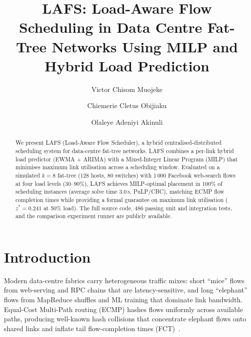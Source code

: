 \documentclass[runningheads]{llncs}
\begin{document}
\title{LAFS: Load-Aware Flow Scheduling in Data Centre Fat-Tree Networks Using MILP and Hybrid Load Prediction}

\author{Victor Chisom Muojeke \and
Chiemerie Cletus Obijiaku \and
Olaleye Adeniyi Akinuli}



\maketitle

\begin{abstract}
We present LAFS (Load-Aware Flow Scheduler), a hybrid centralised-distributed scheduling system for data-centre fat-tree networks. LAFS combines a per-link hybrid load predictor (EWMA + ARIMA) with a Mixed-Integer Linear Program (MILP) that minimises maximum link utilisation across a scheduling window. Evaluated on a simulated $k{=}8$ fat-tree (128 hosts, 80 switches) with 1\,000 Facebook web-search flows at four load levels (30–90\%), LAFS achieves MILP-optimal placement in 100\% of scheduling instances (average solve time 3.0\,s, PuLP/CBC), matching ECMP flow completion times while providing a formal guarantee on maximum link utilisation ($z^* = 0.241$ at 50\% load). The full source code, 486 passing unit and integration tests, and the comparison experiment runner are publicly available.
\end{abstract}


\section{Introduction}
\label{sec:intro}

Modern data-centre fabrics carry heterogeneous traffic mixes: short ``mice'' flows from web-serving and RPC chains that are latency-sensitive, and long ``elephant'' flows from MapReduce shuffles and ML training that dominate link bandwidth. Equal-Cost Multi-Path routing (ECMP) hashes flows uniformly across available paths, producing well-known hash collisions that concentrate elephant flows onto shared links and inflate tail flow-completion times (FCT)~\cite{hedera,conga}.
\end{document}
